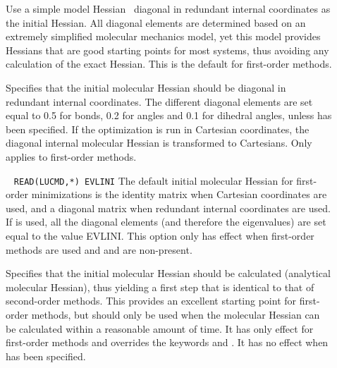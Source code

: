 \begin{description}
\item[]
Use a simple model Hessian~\cite{rlabgkpamcpl241} diagonal in redundant
internal coordinates as the initial Hessian. All diagonal elements are
determined based on an extremely simplified molecular mechanics model,
yet this model provides Hessians that are good starting points for
most systems, thus avoiding any calculation of the exact Hessian. This
is the default for first-order methods.

\item[]
Specifies that the initial molecular Hessian
should be diagonal in redundant internal coordinates. The different diagonal
elements are set equal to 0.5 for bonds, 0.2 for angles and 0.1 for
dihedral angles, unless  has been specified. If the
optimization is run in Cartesian coordinates, the diagonal internal
molecular Hessian is transformed to Cartesians. Only applies to first-order
methods.

\item[]\verb| |
\newline
\verb|READ(LUCMD,*) EVLINI|
The default initial molecular Hessian for first-order
minimizations is the
identity matrix when Cartesian coordinates are used, and a diagonal
matrix when redundant internal coordinates are used. If 
is used, all the diagonal elements (and therefore the eigenvalues) are
set equal to the value EVLINI. This option only has effect when
first-order methods are used and  and  are
non-present.

\item[]
Specifies that the initial molecular Hessian should be
calculated (analytical molecular Hessian), thus yielding a first step that is
identical to that of second-order methods. This provides an excellent starting
point for first-order methods, but should only be used when the
molecular Hessian can be calculated within a reasonable amount of time. It has only
effect for first-order methods and overrides the keywords
 and . It has no effect when  has
been specified.



\end{description}
